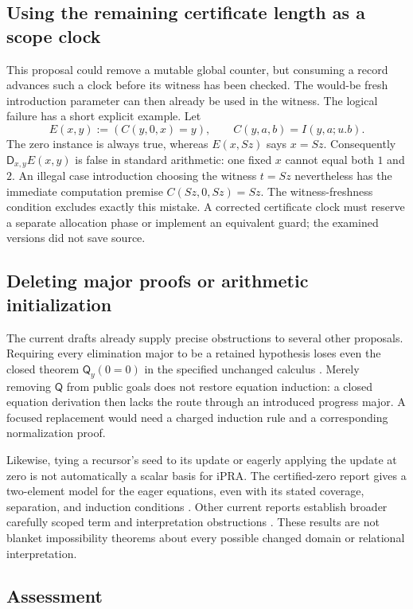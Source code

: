 \documentclass[11pt,letterpaper]{article}
\theoremstyle{definition}\newtheorem{definition}[theorem]{Definition}
\theoremstyle{remark}\newtheorem{remark}[theorem]{Remark}
\newcommand{\D}{\mathsf D}
\newcommand{\Q}{\mathsf Q}
\begin{document}
\subsection{Using the remaining certificate length as a scope clock}

This proposal could remove a mutable global counter, but consuming a
record advances such a clock before its witness has been checked.
The would-be fresh introduction parameter can then already be used in
the witness. The logical failure has a short explicit example. Let
\[
 E(x,y):=(C(y,0,x)=y),\qquad C(y,a,b)=I(y,a;u.b).
\]
The zero instance is always true, whereas $E(x,Sz)$ says $x=Sz$.
Consequently $\D_{x,y}E(x,y)$ is false in standard arithmetic: one fixed
$x$ cannot equal both $1$ and $2$. An illegal case introduction choosing
the witness $t=Sz$ nevertheless has the immediate computation premise
$C(Sz,0,Sz)=Sz$. The witness-freshness condition excludes exactly this
mistake. A corrected certificate clock must reserve a separate allocation
phase or implement an equivalent guard; the examined versions did not
save source.

\subsection{Deleting major proofs or arithmetic initialization}

The current drafts already supply precise obstructions to several other
proposals. Requiring every elimination major to be a retained hypothesis
loses even the closed theorem $\Q_y(0=0)$ in the specified unchanged
calculus \cite{adaptive}. Merely removing $\Q$ from public goals does not
restore equation induction: a closed equation derivation then lacks the
route through an introduced progress major. A focused replacement would
need a charged induction rule and a corresponding normalization proof.

Likewise, tying a recursor's seed to its update or eagerly applying the
update at zero is not automatically a scalar basis for iPRA. The
certified-zero report gives a two-element model for the eager equations,
even with its stated coverage, separation, and induction conditions
\cite{certified}. Other current reports establish broader carefully
scoped term and interpretation obstructions \cite{adaptive,scopes}.
These results are not blanket impossibility theorems about every possible
changed domain or relational interpretation.

\subsection{Assessment}
\end{document}
